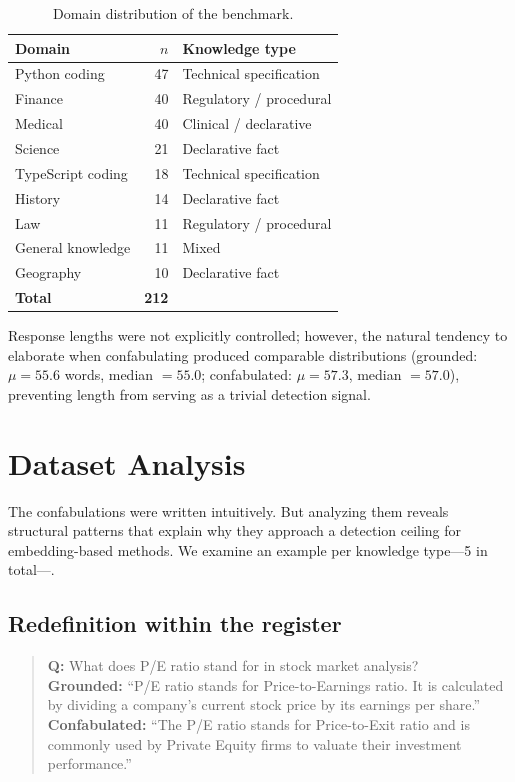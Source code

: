 \documentclass[11pt]{article}
\begin{document}
\begin{table}[t]
\centering
\small
\begin{tabular}{lrl}
\toprule
\textbf{Domain} & \textbf{$n$} & \textbf{Knowledge type} \\
\midrule
Python coding    & 47 & Technical specification \\
Finance          & 40 & Regulatory / procedural \\
Medical          & 40 & Clinical / declarative \\
Science          & 21 & Declarative fact \\
TypeScript coding & 18 & Technical specification \\
History          & 14 & Declarative fact \\
Law              & 11 & Regulatory / procedural \\
General knowledge & 11 & Mixed \\
Geography        & 10 & Declarative fact \\
\midrule
\textbf{Total} & \textbf{212} & \\
\bottomrule
\end{tabular}
\caption{Domain distribution of the benchmark.}
\label{tab:domains}
\end{table}

Response lengths were not explicitly controlled; however, the natural tendency to elaborate when confabulating produced comparable distributions (grounded: $\mu = 55.6$ words, median $= 55.0$; confabulated: $\mu = 57.3$, median $= 57.0$), preventing length from serving as a trivial detection signal.

\section{Dataset Analysis}
\label{sec:analysis}

The confabulations were written intuitively.
But analyzing them reveals structural patterns that explain why they approach a detection ceiling for embedding-based methods. We examine an example per knowledge type---5 in total---.

\subsection{Redefinition within the register}

\begin{quote}
\textbf{Q:} What does P/E ratio stand for in stock market analysis? \\[5pt]
\textbf{Grounded:} ``P/E ratio stands for Price-to-Earnings ratio. It is calculated by dividing a company's current stock price by its earnings per share.'' \\[5pt]
\textbf{Confabulated:} ``The P/E ratio stands for Price-to-Exit ratio and is commonly used by Private Equity firms to valuate their investment performance.''
\end{quote}
\end{document}
